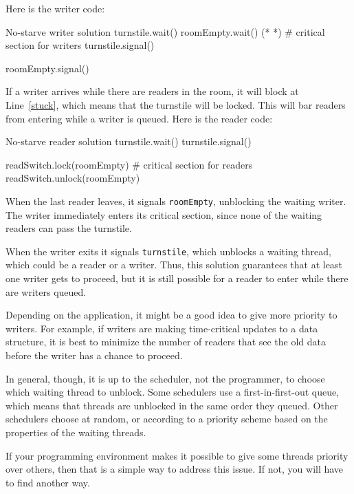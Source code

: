 
Here is the writer code:

\begin{lstbox}{No-starve writer solution}
turnstile.wait()
    roomEmpty.wait()           (* \label{stuck} *)
    # critical section for writers
turnstile.signal()

roomEmpty.signal()
\end{lstbox}

If a writer arrives while there are readers in the room, it
will block at Line~\ref{stuck}, which means that the turnstile will
be locked.  This will bar readers from entering while a writer
is queued.  Here is the reader code:

\begin{lstbox}{No-starve reader solution}
turnstile.wait()
turnstile.signal()

readSwitch.lock(roomEmpty)
    # critical section for readers
readSwitch.unlock(roomEmpty)
\end{lstbox}

When the last reader leaves, it signals {\tt roomEmpty},
unblocking the waiting writer.  The writer immediately
enters its critical section, since none of the waiting
readers can pass the turnstile.

When the writer exits it signals {\tt turnstile}, which unblocks a
waiting thread, which could be a reader or a writer.  Thus, this
solution guarantees that at least one writer gets to proceed, but it
is still possible for a reader to enter while there are writers
queued.  

Depending on the application, it might be a good idea to
give more priority to writers.  For example, if writers are making
time-critical updates to a data structure, it is best
to minimize the number of readers that see the old data before
the writer has a chance to proceed.

In general, though, it is up to the scheduler, not the programmer,
to choose which waiting thread to unblock.
Some schedulers use a first-in-first-out queue, which means
that threads are unblocked in the same order they queued.
Other schedulers choose at random, or according to
a priority scheme based on the properties of the waiting
threads.

If your programming environment makes it possible to give
some threads priority over others, then that is a simple way
to address this issue.  If not, you will have to find another
way.


